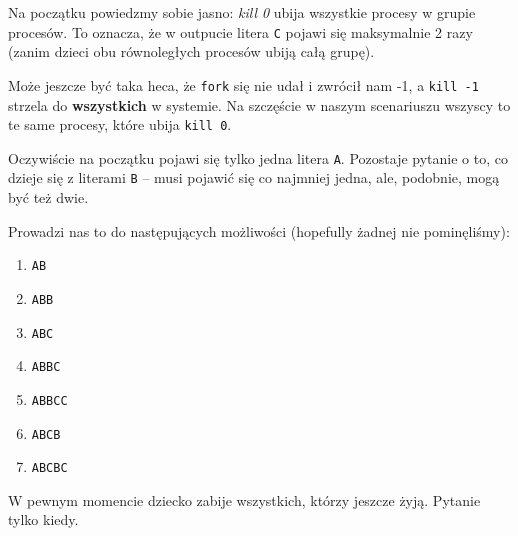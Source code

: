 Na początku powiedzmy sobie jasno: \textit{kill 0} ubija wszystkie procesy w grupie procesów. To oznacza, że w outpucie litera \texttt{C} pojawi się maksymalnie 2 razy (zanim dzieci obu równoległych procesów ubiją całą grupę).

Może jeszcze być taka heca, że \texttt{fork} się nie udał i zwrócił nam -1, a \texttt{kill -1} strzela do \textbf{wszystkich} w systemie. Na szczęście w naszym scenariuszu wszyscy to te same procesy, które ubija \texttt{kill 0}.

Oczywiście na początku pojawi się tylko jedna litera \texttt{A}. Pozostaje pytanie o to, co dzieje się z literami \texttt{B} -- musi pojawić się co najmniej jedna, ale, podobnie, mogą być też dwie.

Prowadzi nas to do następujących możliwości (hopefully żadnej nie pominęliśmy): \begin{enumerate}
	\item \texttt{AB}
	\item \texttt{ABB}
	\item \texttt{ABC}
	\item \texttt{ABBC}
	\item \texttt{ABBCC}
	\item \texttt{ABCB}
	\item \texttt{ABCBC}

\end{enumerate}

W pewnym momencie dziecko zabije wszystkich, którzy jeszcze żyją. Pytanie tylko kiedy.